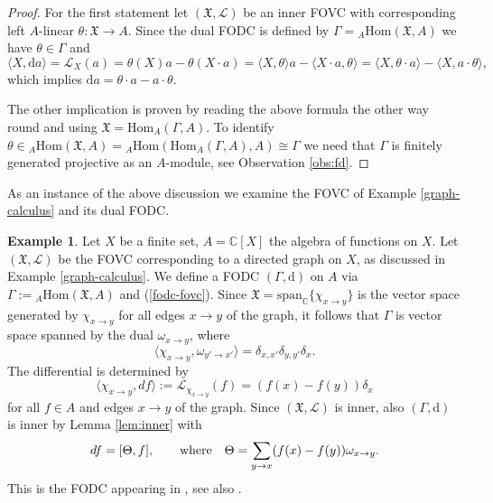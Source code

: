 \documentclass{article}
\theoremstyle{definition}
\newtheorem{example}[thm]{Example}
\newcommand{\C}{{\mathbb{C}}}
\newcommand{\ra}{{\rightarrow}}
\newcommand{\de}{{\delta}}
\newcommand{\Chi}{{\mathfrak{X}}}
\begin{document}
	\begin{proof}
		For the first statement let $(\mathfrak{X},\mathscr{L})$ be an inner FOVC with corresponding left $A$-linear $\theta\colon\mathfrak{X}\to A$. Since the dual FODC is defined by $\Gamma={}_A\mathrm{Hom}(\mathfrak{X},A)$ {we have} $\theta\in\Gamma$ and
		$$
		\langle X,\mathrm{d}a\rangle
		=\mathscr{L}_X(a)
		=\theta(X)a-\theta(X\cdot a)
		=\langle X,\theta\rangle a-\langle X\cdot a,\theta\rangle
		=\langle X,\theta\cdot a\rangle-\langle X,a\cdot\theta\rangle,
		$$
		which implies $\mathrm{d}a=\theta\cdot a-a\cdot\theta$.
		
		The other implication is proven by reading the above formula the other way round and using $\mathfrak{X}=\mathrm{Hom}_A(\Gamma,A)$. To identify $\theta\in{}_A\mathrm{Hom}(\mathfrak{X},A)={}_A\mathrm{Hom}(\mathrm{Hom}_A(\Gamma,A),A)\cong\Gamma$ we need that $\Gamma$ is finitely generated projective as an $A$-module, see Observation \ref{obs:fd}.
	\end{proof}
	
	As an instance of the above discussion we examine the FOVC of Example \ref{graph-calculus} and its dual FODC.
	
	\begin{example}
		Let $X$ be a finite set, $A=\C[X]$ the algebra of functions on $X$. Let $(\Chi, \mathscr{L})$ be the {FOVC corresponding to a directed graph on $X$}, as discussed in Example \ref{graph-calculus}. We define a FODC $(\Gamma,\mathrm{d})$ 
		on $A$ via {$\Gamma:={}_A\mathrm{Hom}(\mathfrak{X},A)$ and (\ref{fodc-fovc}). Since $\mathfrak{X}=\mathrm{span}_\mathbb{C}\{\chi_{x\to y}\}$ is the vector space generated by $\chi_{x\to y}$ for all edges $x\to y$ of the graph, it follows that $\Gamma$ is vector space spanned by the dual $\omega_{x\to y}$, where 
			$$
			\langle\chi_{x\to y},\omega_{y'\to x'}\rangle=\delta_{x,x'}\delta_{y,y'}\delta_x.
			$$
			The differential is determined by}
		\begin{equation}
			\langle \chi_{x\ra y}, df \rangle := \mathscr{L}_{\chi_{x\ra y}}(f)=(f(x)-f(y))\de_x
		\end{equation}
		for all $f\in A$ and edges $x\to y$ of the graph.
		Since $(\Chi, \mathscr{L})$ is inner, also $(\Gamma, \mathrm{d})$ is inner by Lemma \ref{lem:inner} with
		$$
		df=[\Theta,f], \qquad \hbox{where} \quad \Theta=\sum_{y\ra x} (f(x)-f(y))\omega_{x\ra y}.
		$$
		This is the FODC appearing in \cite[Proposition 1.24]{bm}, {see also \cite{Cas,DimMul}}.
	\end{example}
	
\end{document}
